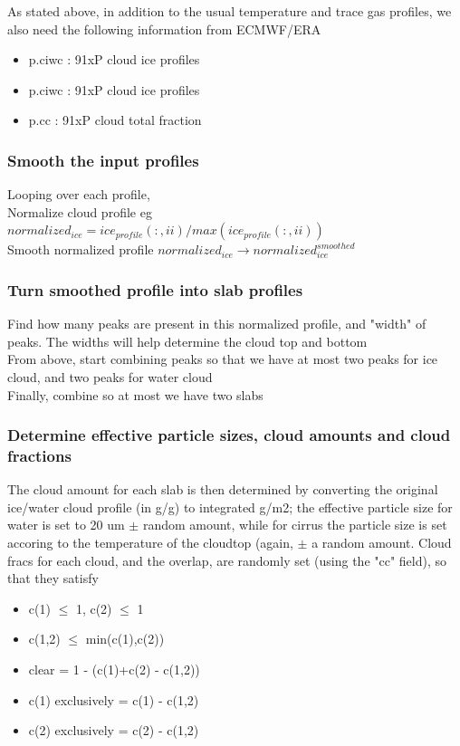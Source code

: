 \documentclass[11pt]{article}
\begin{document}
As stated above, in addition to the usual temperature and trace gas profiles, we also need the following information 
from ECMWF/ERA
\begin{itemize}
  \item p.ciwc : 91xP           cloud ice profiles
  \item p.ciwc : 91xP           cloud ice profiles
  \item p.cc   : 91xP           cloud total fraction
\end{itemize}

\subsubsection{Smooth the input profiles}
Looping over each profile, \\
Normalize cloud profile eg $normalized_{ice} = ice_{profile}(:,ii)/max(ice_{profile}(:,ii))$ \\
Smooth normalized profile $normalized_{ice} \rightarrow normalized_{ice}^{smoothed}$ \\

\subsubsection{Turn smoothed profile into slab profiles}
Find how many peaks are present in this normalized profile, and "width" of peaks. The widths will help 
determine the cloud top and bottom\\
From above, start combining peaks so that we have at most two peaks for ice cloud, and two peaks for water cloud\\
Finally, combine so at most we have two slabs\\

\subsubsection{Determine effective particle sizes, cloud amounts and cloud fractions}
The cloud amount for each slab is then determined by converting the original ice/water cloud profile (in g/g) to 
integrated g/m2; the effective particle size for water is set to 20 um $\pm$ random amount, while for cirrus
the particle size is set accoring to the temperature of the cloudtop (again, $\pm$ a random amount. 
Cloud fracs for each cloud, and the overlap, are randomly set (using the "cc" field), so that they satisfy 
\begin{itemize}
  \item c(1) $\le$ 1, c(2) $\le$ 1
  \item c(1,2) $\le$ min(c(1),c(2))
  \item clear = 1 - (c(1)+c(2) - c(1,2))
  \item c(1) exclusively = c(1) - c(1,2)
  \item c(2) exclusively = c(2) - c(1,2)
\end{itemize}
\end{document}
